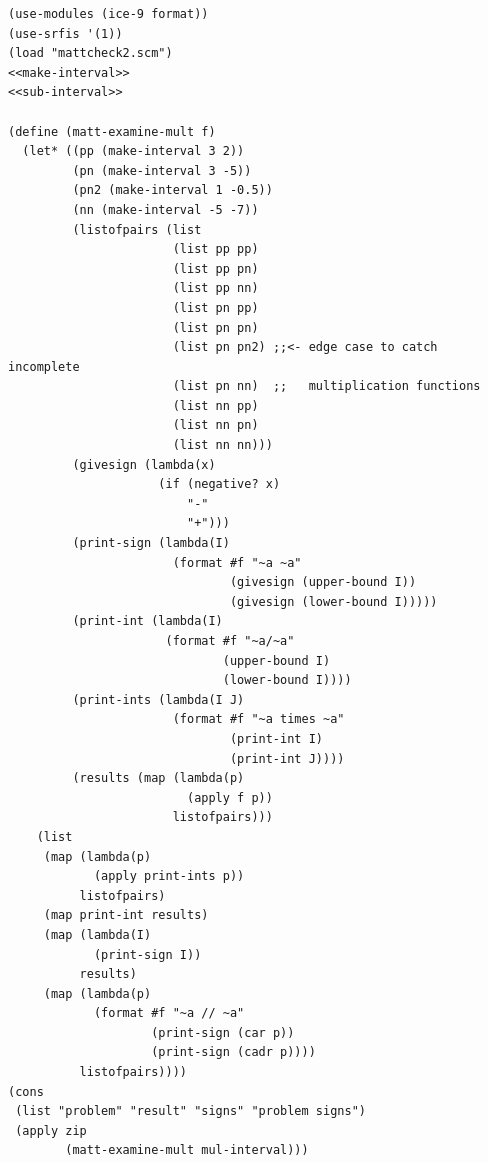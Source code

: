 \documentclass[final,fleqn,titlepage,twoside]{article}
\begin{document}
\begin{verbatim}
(use-modules (ice-9 format))
(use-srfis '(1))
(load "mattcheck2.scm")
<<make-interval>>
<<sub-interval>>

(define (matt-examine-mult f)
  (let* ((pp (make-interval 3 2))
         (pn (make-interval 3 -5))
         (pn2 (make-interval 1 -0.5))
         (nn (make-interval -5 -7))
         (listofpairs (list
                       (list pp pp)
                       (list pp pn)
                       (list pp nn)
                       (list pn pp)
                       (list pn pn)
                       (list pn pn2) ;;<- edge case to catch incomplete
                       (list pn nn)  ;;   multiplication functions
                       (list nn pp)
                       (list nn pn)
                       (list nn nn)))
         (givesign (lambda(x)
                     (if (negative? x)
                         "-"
                         "+")))
         (print-sign (lambda(I)
                       (format #f "~a ~a"
                               (givesign (upper-bound I))
                               (givesign (lower-bound I)))))
         (print-int (lambda(I)
                      (format #f "~a/~a"
                              (upper-bound I)
                              (lower-bound I))))
         (print-ints (lambda(I J)
                       (format #f "~a times ~a"
                               (print-int I)
                               (print-int J))))
         (results (map (lambda(p)
                         (apply f p))
                       listofpairs)))
    (list
     (map (lambda(p)
            (apply print-ints p))
          listofpairs)
     (map print-int results)
     (map (lambda(I)
            (print-sign I))
          results)
     (map (lambda(p)
            (format #f "~a // ~a"
                    (print-sign (car p))
                    (print-sign (cadr p))))
          listofpairs))))
(cons
 (list "problem" "result" "signs" "problem signs")
 (apply zip 
        (matt-examine-mult mul-interval)))
\end{verbatim}
\end{document}
